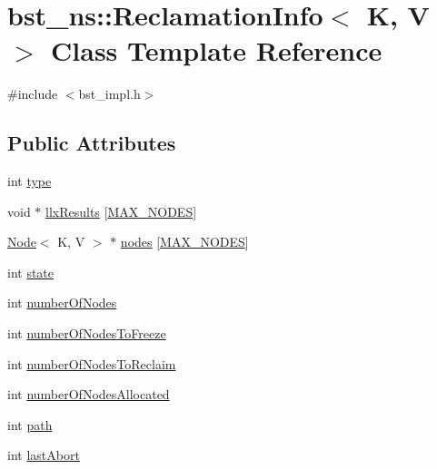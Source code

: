 \hypertarget{classbst__ns_1_1ReclamationInfo}{}\section{bst\+\_\+ns\+:\+:Reclamation\+Info$<$ K, V $>$ Class Template Reference}
\label{classbst__ns_1_1ReclamationInfo}


{\ttfamily \#include $<$bst\+\_\+impl.\+h$>$}

\subsection*{Public Attributes}
\begin{DoxyCompactItemize}
\item 
int \hyperlink{classbst__ns_1_1ReclamationInfo_ad7749ba8daa9454ccaf70877ae3797a0}{type}
\item 
void $\ast$ \hyperlink{classbst__ns_1_1ReclamationInfo_aa12e3a5b91c393d63de9582d26c88525}{llx\+Results} \mbox{[}\hyperlink{scxrecord_8h_abd2aacdca9cb2a1a30f3392256b96ea3}{M\+A\+X\+\_\+\+N\+O\+D\+ES}\mbox{]}
\item 
\hyperlink{classbst__ns_1_1Node}{Node}$<$ K, V $>$ $\ast$ \hyperlink{classbst__ns_1_1ReclamationInfo_aba682f7f7dacd2c3e8adf2ccf8a17073}{nodes} \mbox{[}\hyperlink{scxrecord_8h_abd2aacdca9cb2a1a30f3392256b96ea3}{M\+A\+X\+\_\+\+N\+O\+D\+ES}\mbox{]}
\item 
int \hyperlink{classbst__ns_1_1ReclamationInfo_ade9df2aa225f77af64f30d89dcb3037c}{state}
\item 
int \hyperlink{classbst__ns_1_1ReclamationInfo_aef2fde1573b0f5d80800b180d83e8dc0}{number\+Of\+Nodes}
\item 
int \hyperlink{classbst__ns_1_1ReclamationInfo_abad901212e23fc0b1ab2094c537f1fc2}{number\+Of\+Nodes\+To\+Freeze}
\item 
int \hyperlink{classbst__ns_1_1ReclamationInfo_a5488dfe4318b54453e922c7a1cab020a}{number\+Of\+Nodes\+To\+Reclaim}
\item 
int \hyperlink{classbst__ns_1_1ReclamationInfo_a2bb983af0e2f44e78735e2b0bf5b3e7f}{number\+Of\+Nodes\+Allocated}
\item 
int \hyperlink{classbst__ns_1_1ReclamationInfo_a5ae6fd8061628629d525541e00518966}{path}
\item 
int \hyperlink{classbst__ns_1_1ReclamationInfo_aea753345c52d877c29aff867f58dbe5f}{last\+Abort}
\end{DoxyCompactItemize}


